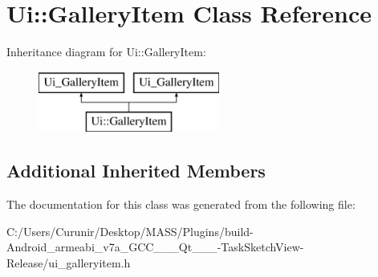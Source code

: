 \hypertarget{class_ui_1_1_gallery_item}{}\section{Ui\+:\+:Gallery\+Item Class Reference}
\label{class_ui_1_1_gallery_item}
Inheritance diagram for Ui\+:\+:Gallery\+Item\+:\begin{figure}[H]
\begin{center}
\leavevmode
\includegraphics[height=2.000000cm]{class_ui_1_1_gallery_item}
\end{center}
\end{figure}
\subsection*{Additional Inherited Members}


The documentation for this class was generated from the following file\+:\begin{DoxyCompactItemize}
\item 
C\+:/\+Users/\+Curunir/\+Desktop/\+M\+A\+S\+S/\+Plugins/build-\/\+Android\+\_\+armeabi\+\_\+v7a\+\_\+\+G\+C\+C\+\_\+\_\+\_\+\+Qt\+\_\+\_\+\_-\/\+Task\+Sketch\+View-\/\+Release/ui\+\_\+galleryitem.\+h\end{DoxyCompactItemize}

